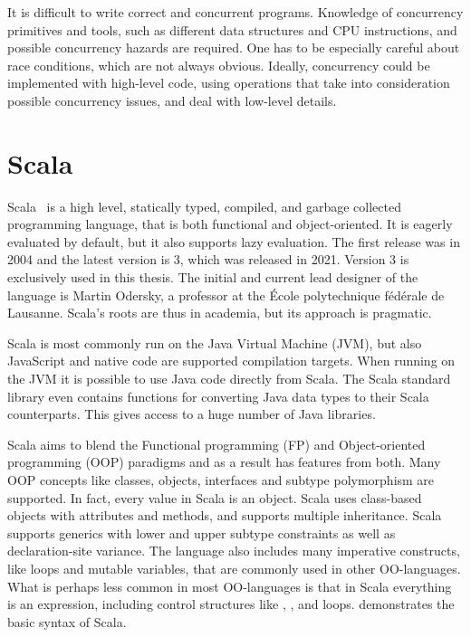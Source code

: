 It is difficult to write correct and concurrent programs. Knowledge of concurrency primitives and tools, such as different data structures and CPU instructions, and possible concurrency hazards are required. One has to be especially careful about race conditions, which are not always obvious. Ideally, concurrency could be implemented with high-level code, using operations that take into consideration possible concurrency issues, and deal with low-level details.



\section{Scala} \label{scala}
Scala~\cite{scala-lang} is a high level, statically typed, compiled, and garbage collected programming language, that is both functional and object-oriented. It is eagerly evaluated by default, but it also supports lazy evaluation. The first release was in 2004 and the latest version is 3, which was released in 2021. Version 3 is exclusively used in this thesis. The initial and current lead designer of the language is Martin Odersky, a professor at the École polytechnique fédérale de Lausanne. Scala's roots are thus in academia, but its approach is pragmatic.

Scala is most commonly run on the Java Virtual Machine (JVM), but also JavaScript and native code are supported compilation targets. When running on the JVM it is possible to use Java code directly from Scala. The Scala standard library even contains functions for converting Java data types to their Scala counterparts. This gives access to a huge number of Java libraries.

Scala aims to blend the Functional programming (FP) and Object-oriented programming (OOP) paradigms and as a result has features from both. Many OOP concepts like classes, objects, interfaces and subtype polymorphism are supported. In fact, every value in Scala is an object. Scala uses class-based objects with attributes and methods, and supports multiple inheritance. Scala supports generics with lower and upper subtype constraints as well as declaration-site variance. The language also includes many imperative constructs, like loops and mutable variables, that are commonly used in other OO-languages. What is perhaps less common in most OO-languages is that in Scala everything is an expression, including control structures like , , and loops.  demonstrates the basic syntax of Scala.


